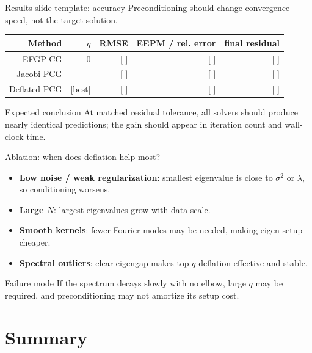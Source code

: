 \documentclass[aspectratio=169,10pt]{beamer}
\begin{document}
\begin{frame}{Results slide template: accuracy}
\small
Preconditioning should change convergence speed, not the target solution.
\begin{center}
\begin{tabular}{rrrrr}
\toprule
Method & $q$ & RMSE & EEPM / rel. error & final residual \\
\midrule
EFGP-CG & 0 & [ ] & [ ] & [ ] \\
Jacobi-PCG & -- & [ ] & [ ] & [ ] \\
Deflated PCG & [best] & [ ] & [ ] & [ ] \\
\bottomrule
\end{tabular}
\end{center}

\begin{alertblock}{Expected conclusion}
At matched residual tolerance, all solvers should produce nearly identical predictions; the gain should appear in iteration count and wall-clock time.
\end{alertblock}
\end{frame}

\begin{frame}{Ablation: when does deflation help most?}
\begin{itemize}
  \item \textbf{Low noise / weak regularization}: smallest eigenvalue is close to $\sigma^2$ or $\lambda$, so conditioning worsens.
  \item \textbf{Large $N$}: largest eigenvalues grow with data scale.
  \item \textbf{Smooth kernels}: fewer Fourier modes may be needed, making eigen setup cheaper.
  \item \textbf{Spectral outliers}: clear eigengap makes top-$q$ deflation effective and stable.
\end{itemize}

\begin{block}{Failure mode}
If the spectrum decays slowly with no elbow, large $q$ may be required, and preconditioning may not amortize its setup cost.
\end{block}
\end{frame}

\section{Summary}
\end{document}
